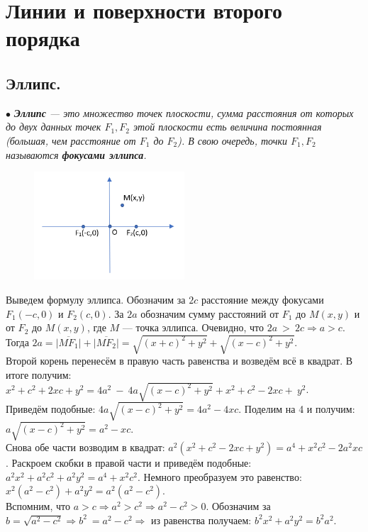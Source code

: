 \documentclass[a4paper, 12pt]{report}
\begin{document}
\chapter{Линии и поверхности второго порядка}

\section{Эллипс.}

$\bullet$ \textit{\textbf{Эллипс} --- это множество точек плоскости, сумма расстояния от которых до двух данных точек $F_1, F_2$ этой плоскости есть величина постоянная (большая, чем расстояние от $F_1$ до $F_2$). В свою очередь, точки $F_1, F_2$ называются \textbf{фокусами эллипса}.}\\
\begin{figure}
	\includegraphics[width=0.5\textwidth]{Эллипс_1.PNG}
	\label{ris:image}
\end{figure}
Выведем формулу эллипса. Обозначим за $2c$ расстояние между фокусами $F_1(-c, 0)$ и $F_2(c, 0)$. За $2a$ обозначим сумму расстояний от $F_1$ до $M(x, y)$ и от $F_2$ до $M(x, y)$, где $M$ --- точка эллипса. Очевидно, что $2a~>~2c \Rightarrow a > c$. Тогда $2a = \overline{|MF_1|} + \overline{|MF_2|} = \sqrt{(x + c)^2 + y^2} + \sqrt{(x - c)^2 + y^2}$. \\
Второй корень перенесём в правую часть равенства и возведём всё в квадрат. В итоге получим: $x^2 + c^2 + 2xc + y^2 = 4a^2~ -~ 4a\sqrt{(x - c)^2 + y^2} + x^2 + c^2 - 2xc +~ y^2$.\\
Приведём подобные: $4a\sqrt{(x - c)^2 + y^2} = 4a^2 - 4xc$. Поделим на 4 и получим: $a\sqrt{(x - c)^2 + y^2} = a^2 - xc$.\\
Снова обе части возводим в квадрат: $a^2(x^2 + c^2 - 2xc + y^2) = a^4 + x^2c^2 - 2a^2xc$. Раскроем скобки в правой части и приведём подобные: $a^2x^2 + a^2c^2 + a^2y^2 = a^4 + x^2c^2$. Немного преобразуем это равенство: $x^2(a^2 - c^2) + a^2y^2 = a^2(a^2 - c^2)$.\\
Вспомним, что $a > c \Rightarrow a^2 > c^2 \Rightarrow a^2 - c^2 > 0$. Обозначим за $b = \sqrt{a^2 - c^2} \Rightarrow b^2 ~= a^2 - c^2 \Rightarrow$ из равенства получаем: $b^2x^2 + a^2y^2 = b^2a^2$. \\
\end{document}

